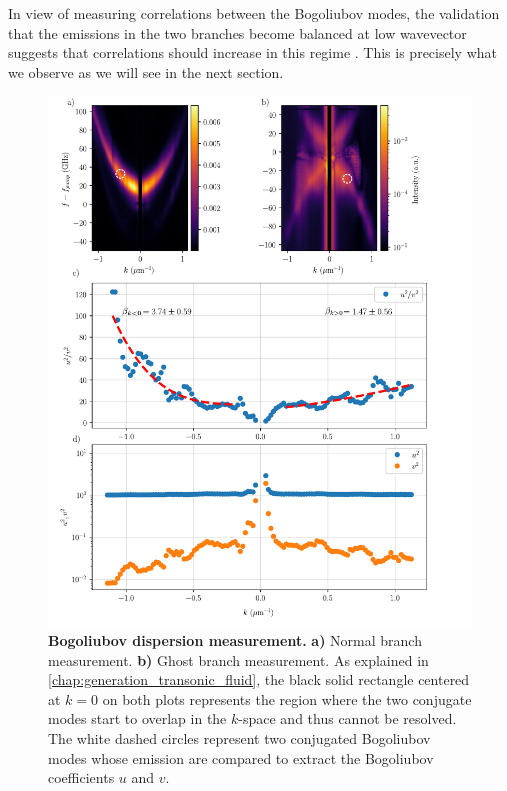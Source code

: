 In view of measuring correlations between the Bogoliubov modes, the validation that the emissions in the two branches become balanced at low wavevector suggests that correlations should increase in this regime \cite{treps_fabre_criteria_2004}. This is precisely what we observe as we will see in the next section.


\begin{figure}
    \centering
    \includegraphics[width=1\textwidth]{chap_correlation/fig/uv_analysis.pdf}
    \caption{\textbf{Bogoliubov dispersion measurement.} \textbf{a)} Normal branch measurement. \textbf{b)} Ghost branch measurement. As explained in \autoref{chap:generation_transonic_fluid}, the black solid rectangle
    centered at $k=0$ on both plots represents the region where the two conjugate modes start to overlap in the $k$-space and thus cannot be resolved. The white dashed circles represent two conjugated Bogoliubov modes whose emission are compared to extract the Bogoliubov coefficients $u$ and $v$.}
    \label{fig:uv_analysis}
\end{figure} 

